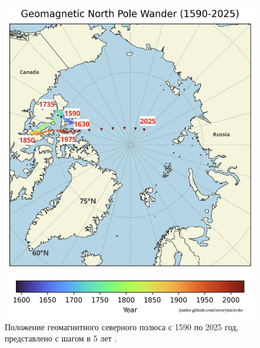 \documentclass[10pt,twocolumn,letterpaper]{article}
\begin{document}
\begin{figure}[t]
\begin{center}
   \includegraphics[width=1\linewidth]{npw.jpg}
\end{center}
   \caption{Положение геомагнитного северного полюса с 1590 по 2025 год, представлено с шагом в 5 лет \cite{142}.}
\label{fig:13}
\label{fig:onecol}
\end{figure}
\end{document}

